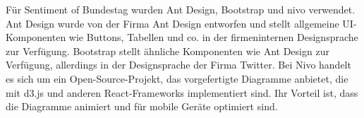 Für Sentiment of Bundestag wurden Ant Design, Bootstrap und nivo verwendet. Ant Design wurde von der Firma Ant Design entworfen und stellt allgemeine UI-Komponenten wie Buttons, Tabellen und co. in der firmeninternen Designsprache zur Verfügung. Bootstrap stellt ähnliche Komponenten wie Ant Design zur Verfügung, allerdings in der Designsprache der Firma Twitter. Bei Nivo handelt es sich um ein Open-Source-Projekt, das vorgefertigte Diagramme anbietet, die mit d3.js und anderen React-Frameworks implementiert sind. Ihr Vorteil ist, dass die Diagramme animiert und für mobile Geräte optimiert sind. 
